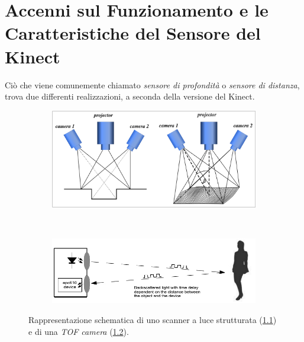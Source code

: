 
\chapter{Accenni sul Funzionamento e le Caratteristiche del Sensore del Kinect} %
\label{chap:kinect}

Ciò che viene comunemente chiamato \emph{sensore di profondità} o \emph{sensore di distanza}, trova due differenti realizzazioni, a seconda della versione del Kinect.

\begin{figure}[h]
    \centering
    \begin{subfigure}[b]{0.48\textwidth}
    \includegraphics[width=\linewidth]{img/3d-structured-light-scanner.png}
        \caption{}
        \label{fig:3d_scanner}
    \end{subfigure}
    ~ %
    \begin{subfigure}[b]{0.48\textwidth}
    \includegraphics[width=\linewidth]{img/tof_camera.jpg}
        \caption{}
        \label{fig:tof_camera}
    \end{subfigure}
    \caption{Rappresentazione schematica di uno scanner a luce strutturata (\ref{fig:3d_scanner}) e di una \emph{TOF camera} (\ref{fig:tof_camera}).}
    \label{fig:distance_sensor}
\end{figure}

